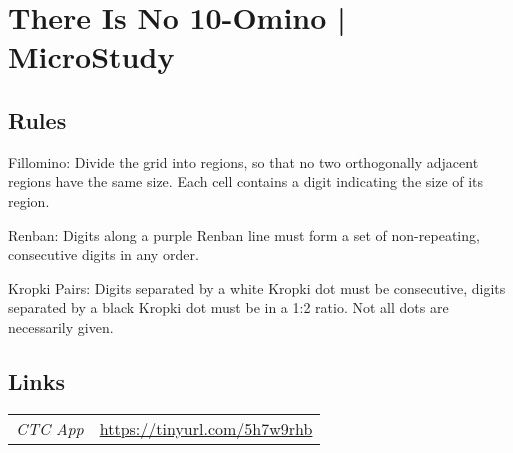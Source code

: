 \section[There Is No 10-Omino | MicroStudy {[\emph{Fillomino, Renban, Kropki Pairs}]}]{There Is No 10-Omino | {\normalfont MicroStudy}}
\label{sec:18-there-is-no-10-omino-microstudy}

\subsection*{Rules}
\begin{markdown}
Fillomino: Divide the grid into regions, so that no two orthogonally adjacent regions have the same size. Each cell contains a digit indicating the size of its region.



Renban: Digits along a purple Renban line must form a set of non-repeating, consecutive digits in any order.



Kropki Pairs: Digits separated by a white Kropki dot must be consecutive, digits separated by a black Kropki dot must be in a 1:2 ratio. Not all dots are necessarily given.
\end{markdown}
\subsection*{Links}
\begin{tabularx}{\textwidth}{l X}
\emph{CTC App} & \url{https://tinyurl.com/5h7w9rhb} \\
\end{tabularx}
\pagebreak
